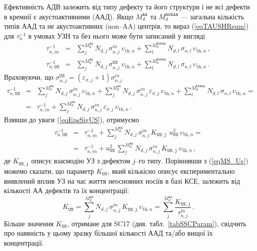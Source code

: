 Ефективність АДВ залежить від типу дефекту та його структури \cite{UST:Medvid}
і не всі дефекти в кремнії є акустоактивними (ААД).
Якщо $M_d^\mathtt{AA}$ та $M_d^\mathtt{nonAA}$ --- загальна кількість типів ААД та не акустоактивних (non--AA) центрів,
то вираз (\ref{eqTAUSHRsum}) для $\tau_{n}^{-1}$ в умовах УЗН та без нього може бути записаний у вигляді
\begin{eqnarray}
\tau_{n,in}^{-1}&=&\sum_j^{M_d^\mathtt{AA}}N_{d,j}\,\sigma_{n,j}^{in}\,\upsilon_{\mathrm{th},n}+
\sum_l^{M_d^\mathtt{nonAA}}N_{d,l}\,\sigma_{n,l}\,\upsilon_{\mathrm{th},n}\,,\\
\tau_{n,\mathtt{US}}^{-1}&=&\sum_j^{M_d^\mathtt{AA}}N_{d,j}\,\sigma_{n,j}^\mathtt{US}\,\upsilon_{\mathrm{th},n}+
\sum_l^{M_d^\mathtt{nonAA}}N_{d,l}\,\sigma_{n,l}\,\upsilon_{\mathrm{th},n}\,.
\end{eqnarray}
Враховуючи, що $\sigma_{n,j}^\mathtt{US}=(\varepsilon_{\sigma,j}+1)\sigma_{n,j}^{in}$
\begin{eqnarray}
\label{eqEpsSigUSA}
\tau_{n,\mathtt{US}}^{-1}&=&\sum_j^{M_d^\mathtt{AA}}N_{d,j}\,\sigma_{n,j}^{in}\,\upsilon_{\mathrm{th},n}+
\sum_j^{M_d^\mathtt{AA}}N_{d,j}\,\sigma_{n,j}^{in}\,\varepsilon_{\sigma,j}\,\upsilon_{\mathrm{th},n}+
\sum_l^{M_d^\mathtt{nonAA}}N_{d,l}\,\sigma_{n,l}\,\upsilon_{\mathrm{th},n}=\nonumber\\
&=&\tau_{n,in}^{-1}+\sum_j^{M_d^\mathtt{AA}}N_{d,j}\,\sigma_{n,j}^{in}\,\varepsilon_{\sigma,j}\,\upsilon_{\mathrm{th},n}\,.
\end{eqnarray}
Взявши до уваги (\ref{eqEpsSigUS}), отримуємо
\begin{eqnarray}
\tau_{n,\mathtt{US}}^{-1}&=&\tau_{n,in}^{-1}+
\sum_j^{M_d^\mathtt{AA}}N_{d,j}\,\sigma_{n,j}^{in}\,K_\mathtt{US,j}\,\,u_{\mathtt{US}}^2\,\upsilon_{\mathrm{th},n}=\nonumber\\
&=&\tau_{n,in}^{-1}+u_{\mathtt{US}}^2\,\sum_j^{M_d^\mathtt{AA}}N_{d,j}\,\sigma_{n,j}^{in}\,K_\mathtt{US,j}\,\upsilon_{\mathrm{th},n}\,,
\end{eqnarray}
де $K_\mathtt{US,j}$ описує взаємодію УЗ з дефектом $j$--го типу.
Порівнявши з (\ref{eqMS_Us}) можемо сказати, що параметр $K_\mathtt{US}$, який кількісно описує експериментально виявлений вплив УЗ на час життя неосновних носіїв в базі КСЕ,
залежить від кількості АА дефектів та їх концентрації:
\begin{equation}
\label{eqKUS}
K_\mathtt{US}=\sum_j^{M_d^\mathtt{AA}}N_{d,j}\,\sigma_{n,j}^{in}\,K_\mathtt{US,j}\,\upsilon_{\mathrm{th},n}=\sum_j^{M_d^\mathtt{AA}}\frac{K_\mathtt{US,j}}{\tau_{n,j}^{in}}\,.
\end{equation}
Більше значення $K_\mathtt{US}$, отримане для SC17 (див. табл.~\ref{tabSSCParam}), свідчить про наявність у цьому зразку більшої кількості ААД та/або вищої їх концентрації.


